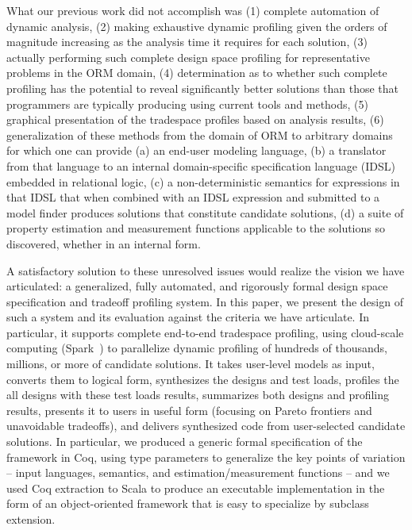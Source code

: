 What our previous work did not accomplish was (1) complete automation of dynamic analysis, (2) making exhaustive dynamic profiling given the orders of magnitude increasing as the analysis time it requires for each solution, (3) actually performing such complete design space profiling for representative problems in the ORM domain, (4) determination as to whether such complete profiling has the potential to reveal significantly better solutions than those that programmers are typically producing using current tools and methods, (5) graphical presentation of the tradespace profiles based on analysis results, (6) generalization of these methods from the domain of ORM to arbitrary domains for which one can provide (a) an end-user modeling language, (b) a translator from that language to an internal domain-specific specification language (IDSL) embedded in relational logic, (c) a non-deterministic semantics for expressions in that IDSL that when combined with an IDSL expression and submitted to a model finder produces solutions that constitute candidate solutions, (d) a suite of property estimation and measurement functions applicable to the solutions so discovered, whether in an internal form.

A satisfactory solution to these unresolved issues would realize the vision we have articulated: a generalized, fully automated, and rigorously formal design space specification and tradeoff profiling system. In this paper, we present the design of such a system and its evaluation against the criteria we have articulate. In particular, it supports complete end-to-end tradespace profiling, using cloud-scale computing (Spark~\cite{spark_paper}) to parallelize dynamic profiling of hundreds of thousands, millions, or more of candidate solutions. It takes user-level models as input, converts them to logical form, synthesizes the designs and test loads, profiles the all designs with these test loads results, summarizes both designs and profiling results, presents it to users in useful form (focusing on Pareto frontiers and unavoidable tradeoffs), and delivers synthesized code from user-selected candidate solutions. In particular, we produced a generic formal specification of the framework in Coq, using type parameters to generalize the key points of variation -- input languages, semantics, and estimation/measurement functions -- and we used Coq extraction to Scala to produce an executable implementation in the form of an object-oriented framework that is easy to specialize by subclass extension.

